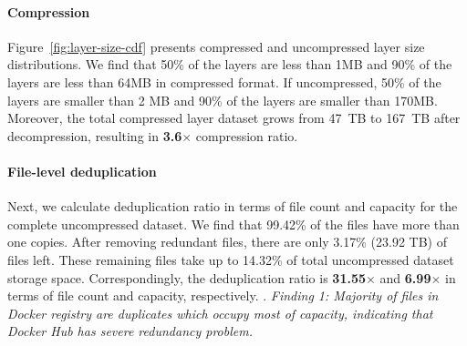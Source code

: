 \paragraph{Compression}



Figure~\ref{fig:layer-size-cdf} presents compressed and uncompressed layer size
distributions.
%
%
We find that 50\% of the layers are less than 1MB and 90\% of the layers are
less than 64MB in compressed format.
%
If uncompressed, 50\% of the layers are smaller than 2 MB and 90\% of the
layers are smaller than 170MB.
%
%
Moreover, the total compressed layer dataset grows from 47~TB to 167~TB after decompression, resulting in \textbf{3.6$\times$} compression ratio.
%
%
%

\paragraph{File-level deduplication}
Next, we calculate deduplication ratio in terms of file count and capacity for
the complete uncompressed dataset. %
%
We find that 99.42\% of the files have more than one copies. 
%
%
%
%
After removing redundant files, there are only 3.17\% (23.92 TB) of files left. These remaining files take up to 14.32\% of total uncompressed dataset storage space.
%
Correspondingly, the deduplication ratio is \textbf{31.55$\times$} and \textbf{6.99$\times$} in terms of
file count and capacity, respectively.
%
.
%
%
\textit{Finding 1: Majority of files in Docker registry are duplicates which
occupy most of capacity, indicating that Docker Hub has severe redundancy
problem.}

